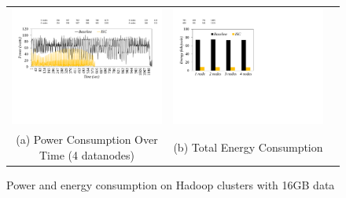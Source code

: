 \begin{figure}[t]
  \centering
  \renewcommand{\tabcolsep}{2mm}
  \begin{tabular}{ccc}
 \includegraphics[width=1.25\columnwidth]{figures/Hadoop_power_clusters.pdf}&
  \includegraphics[width=0.75\columnwidth]{figures/Hadoop_energy_clusters.pdf}\\
  (a) Power Consumption Over Time (4 datanodes) & (b) Total Energy Consumption 
\end{tabular}
  \caption{Power and energy consumption on Hadoop clusters with 16GB data}
  \label{fig:total_energy_on_clusters}
\end{figure}






